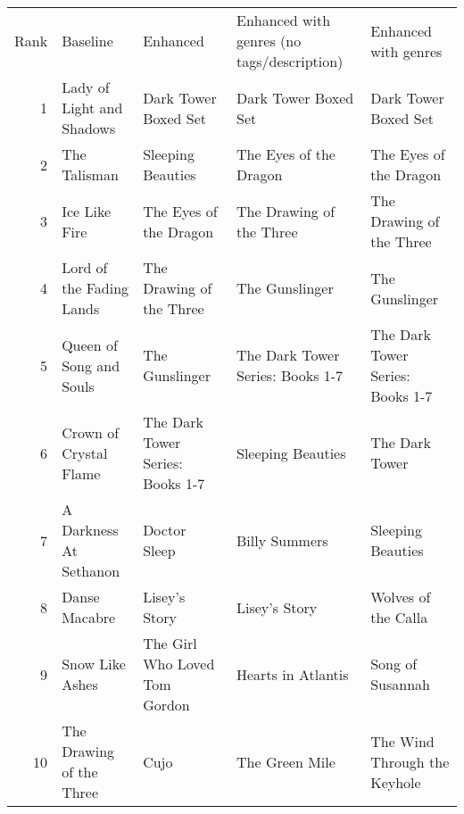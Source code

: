 \begin{tabular}{rllll}
Rank & Baseline & Enhanced & Enhanced with genres (no tags/description) & Enhanced with genres \\
1 & Lady of Light and Shadows & Dark Tower Boxed Set & Dark Tower Boxed Set & Dark Tower Boxed Set \\
2 & The Talisman & Sleeping Beauties & The Eyes of the Dragon & The Eyes of the Dragon \\
3 & Ice Like Fire & The Eyes of the Dragon & The Drawing of the Three & The Drawing of the Three \\
4 & Lord of the Fading Lands & The Drawing of the Three & The Gunslinger & The Gunslinger \\
5 & Queen of Song and Souls & The Gunslinger & The Dark Tower Series: Books 1-7 & The Dark Tower Series: Books 1-7 \\
6 & Crown of Crystal Flame & The Dark Tower Series: Books 1-7 & Sleeping Beauties & The Dark Tower \\
7 & A Darkness At Sethanon & Doctor Sleep & Billy Summers & Sleeping Beauties \\
8 & Danse Macabre & Lisey's Story & Lisey's Story & Wolves of the Calla \\
9 & Snow Like Ashes & The Girl Who Loved Tom Gordon & Hearts in Atlantis & Song of Susannah \\
10 & The Drawing of the Three & Cujo & The Green Mile & The Wind Through the Keyhole \\
\end{tabular}
